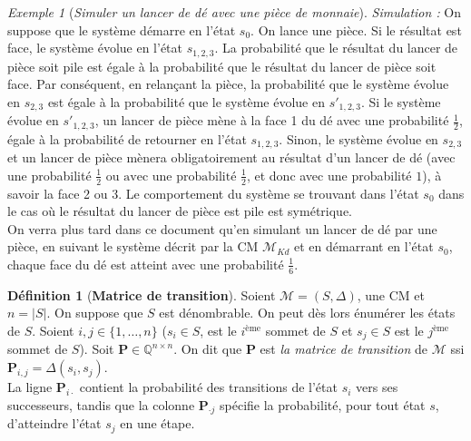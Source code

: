 \documentclass[12pt,a4paper]{report}
\theoremstyle{definition}%
\newtheorem{definition}{Définition}[chapter]
\theoremstyle{remark}
\newtheorem{example}{Exemple}[chapter]
\newcommand{\ssi}{ssi }
\begin{document}
\begin{example} [\textit{Simuler un lancer de dé avec une pièce de monnaie}]
	\textit{Simulation : }On suppose que le système démarre en l'état $s_0$. On lance une pièce. Si le résultat est face, le système évolue en l'état $s_{1, 2, 3}$. La probabilité que le résultat du lancer de pièce soit pile est égale à la probabilité que le résultat du lancer de pièce soit face. Par conséquent, en relançant la pièce, la probabilité que le système évolue en $s_{2, 3}$ est égale à la probabilité que le système évolue en $s'_{1, 2, 3}$. Si le système évolue en $s'_{1, 2, 3}$, un lancer de pièce mène à la face 1 du dé avec une probabilité $\frac{1}{2}$, égale à la probabilité de retourner en l'état $s_{1, 2, 3}$. Sinon, le système évolue en $s_{2, 3}$ et un lancer de pièce mènera obligatoirement au résultat d'un lancer de dé (avec une probabilité $\frac{1}{2} \text{ ou avec une probabilité }  \frac{1}{2}$, et donc avec une probabilité $1$), à savoir la face 2 ou 3. Le comportement du système se trouvant dans l'état $s_0$ dans le cas où le résultat du lancer de pièce est pile est symétrique.\\
	
	On verra plus tard dans ce document qu'en simulant un lancer de dé par une pièce, en suivant le système décrit par la CM $\mathcal{M}_{Kd}$ et en démarrant en l'état $s_0$, chaque face du dé est atteint avec une probabilité $\frac{1}{6}$.\\
	
\end{example}

\begin{definition}[\textbf{Matrice de transition}]
	Soient $\mathcal{M} = (S, \Delta)$, une CM et $n = |S|$. On suppose que $S$ est dénombrable. On peut dès lors énumérer les états de $S$. Soient $i,j \in \{1, \dots, n\}$ ($s_i \in S$, est le $i^{\text{ème}}$ sommet de $S$ et $s_j \in S$ est le $j^{\text{ème}}$ sommet de $S$). Soit \textbf{P}$\in \mathbb{Q}^{n \times n}$. On dit que
	\textbf{P} est \textit{la matrice de transition} de $\mathcal{M}$ \ssi $\textbf{P}_{i,j} = \Delta(s_i, s_j)$.\\
	La ligne $\textbf{P}_{i \cdot}$ contient la probabilité des transitions de l'état $s_i$ vers ses successeurs, tandis que la colonne $\textbf{P}_{\cdot j}$ spécifie la probabilité, pour tout état $s$, d'atteindre l'état $s_j$ en une étape.
\end{definition}
\end{document}
